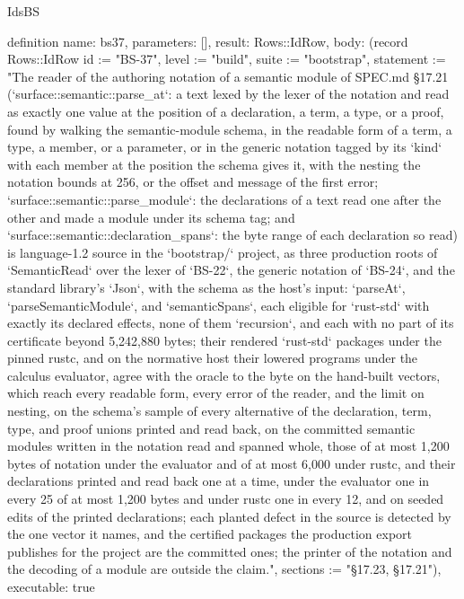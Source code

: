 \begin{lexlean}{IdsBS}
\begin{semanticmodule}
definition{
  name: bs37,
  parameters: [],
  result: Rows::IdRow,
  body: (record Rows::IdRow {id := "BS-37", level := "build", suite := "bootstrap", statement := "The reader of the authoring notation of a semantic module of SPEC.md §17.21 (`surface::semantic::parse_at`: a text lexed by the lexer of the notation and read as exactly one value at the position of a declaration, a term, a type, or a proof, found by walking the semantic-module schema, in the readable form of a term, a type, a member, or a parameter, or in the generic notation tagged by its `kind` with each member at the position the schema gives it, with the nesting the notation bounds at 256, or the offset and message of the first error; `surface::semantic::parse_module`: the declarations of a text read one after the other and made a module under its schema tag; and `surface::semantic::declaration_spans`: the byte range of each declaration so read) is language-1.2 source in the `bootstrap/` project, as three production roots of `SemanticRead` over the lexer of `BS-22`, the generic notation of `BS-24`, and the standard library's `Json`, with the schema as the host's input: `parseAt`, `parseSemanticModule`, and `semanticSpans`, each eligible for `rust-std` with exactly its declared effects, none of them `recursion`, and each with no part of its certificate beyond 5,242,880 bytes; their rendered `rust-std` packages under the pinned rustc, and on the normative host their lowered programs under the calculus evaluator, agree with the oracle to the byte on the hand-built vectors, which reach every readable form, every error of the reader, and the limit on nesting, on the schema's sample of every alternative of the declaration, term, type, and proof unions printed and read back, on the committed semantic modules written in the notation read and spanned whole, those of at most 1,200 bytes of notation under the evaluator and of at most 6,000 under rustc, and their declarations printed and read back one at a time, under the evaluator one in every 25 of at most 1,200 bytes and under rustc one in every 12, and on seeded edits of the printed declarations; each planted defect in the source is detected by the one vector it names, and the certified packages the production export publishes for the project are the committed ones; the printer of the notation and the decoding of a module are outside the claim.", sections := "§17.23, §17.21"}),
  executable: true
}


\end{semanticmodule}
\end{lexlean}

